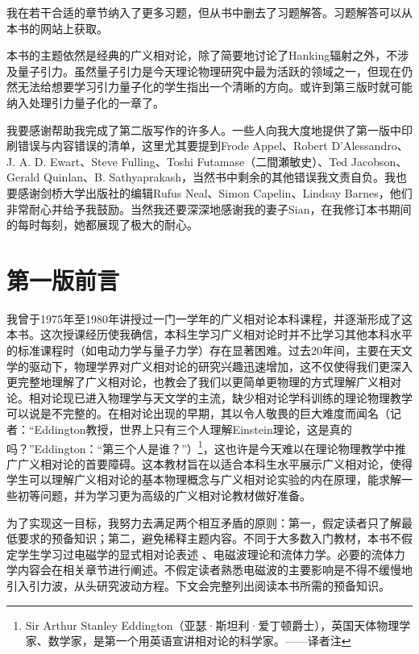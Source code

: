 我在若干合适的章节纳入了更多习题，但从书中删去了习题解答。习题解答可以从本书的网站上获取。

本书的主题依然是经典的广义相对论，除了简要地讨论了Hanking辐射之外，不涉及量子引力。虽然量子引力是今天理论物理研究中最为活跃的领域之一，但现在仍然无法给想要学习引力量子化的学生指出一个清晰的方向。或许到第三版时就可能纳入处理引力量子化的一章了。

我要感谢帮助我完成了第二版写作的许多人。一些人向我大度地提供了第一版中印刷错误与内容错误的清单，这里尤其要提到Frode Appel、Robert D’Alessandro、J. A. D. Ewart、Steve Fulling、Toshi Futamase（二間瀬敏史）、Ted Jacobson、Gerald Quinlan、B. Sathyaprakash，当然书中剩余的其他错误我文责自负。我也要感谢剑桥大学出版社的编辑Rufus Neal、Simon Capelin、Lindsay Barnes，他们非常耐心并给予我鼓励。当然我还要深深地感谢我的妻子Sian，在我修订本书期间的每时每刻，她都展现了极大的耐心。

\chapter*{第一版前言}
我曾于1975年至1980年讲授过一门一学年的广义相对论本科课程，并逐渐形成了这本书。这次授课经历使我确信，本科生学习广义相对论时并不比学习其他本科水平的标准课程时（如电动力学与量子力学）存在显著困难。过去20年间，主要在天文学的驱动下，物理学界对广义相对论的研究兴趣迅速增加，这不仅使得我们更深入更完整地理解了广义相对论，也教会了我们以更简单更物理的方式理解广义相对论。相对论现已进入物理学与天文学的主流，缺少相对论学科训练的理论物理教学可以说是不完整的。在相对论出现的早期，其以令人敬畏的巨大难度而闻名（记者：“Eddington教授，世界上只有三个人理解Einstein理论，这是真的吗？”Eddington：“第三个人是谁？”）\footnote{Sir Arthur Stanley Eddington（亚瑟·斯坦利·爱丁顿爵士），英国天体物理学家、数学家，是第一个用英语宣讲相对论的科学家。——译者注}，这也许是今天难以在理论物理教学中推广广义相对论的首要障碍。这本教材旨在以适合本科生水平展示广义相对论，使得学生可以理解广义相对论的基本物理概念与广义相对论实验的内在原理，能求解一些初等问题，并为学习更为高级的广义相对论教材做好准备。

为了实现这一目标，我努力去满足两个相互矛盾的原则：第一，假定读者只了解最低要求的预备知识；第二，避免稀释主题内容。不同于大多数入门教材，本书不假定学生学习过电磁学的显式相对论表述%
、电磁波理论和流体力学。必要的流体力学内容会在相关章节进行阐述。不假定读者熟悉电磁波的主要影响是不得不缓慢地引入引力波，从头研究波动方程。下文会完整列出阅读本书所需的预备知识。

